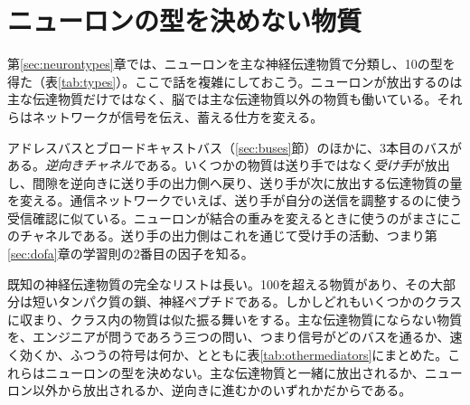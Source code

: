 \chapter{ニューロンの型を決めない物質}
\label{sec:othermediators}

第\ref{sec:neurontypes}章では、ニューロンを主な神経伝達物質で分類し、10の型を得た（表\ref{tab:types}）。ここで話を複雑にしておこう。ニューロンが放出するのは主な伝達物質だけではなく、脳では主な伝達物質以外の物質も働いている。それらはネットワークが信号を伝え、蓄える仕方を変える。

アドレスバスとブロードキャストバス（\ref{sec:buses}節）のほかに、3本目のバスがある。\emph{逆向きチャネル}である。いくつかの物質は送り手ではなく\emph{受け手}が放出し、間隙を逆向きに送り手の出力側へ戻り、送り手が次に放出する伝達物質の量を変える。通信ネットワークでいえば、送り手が自分の送信を調整するのに使う受信確認に似ている。ニューロンが結合の重みを変えるときに使うのがまさにこのチャネルである。送り手の出力側はこれを通じて受け手の活動、つまり第\ref{sec:dofa}章の学習則の2番目の因子を知る。

既知の神経伝達物質の完全なリストは長い。100を超える物質があり、その大部分は短いタンパク質の鎖、神経ペプチドである。しかしどれもいくつかのクラスに収まり、クラス内の物質は似た振る舞いをする。主な伝達物質にならない物質を、エンジニアが問うであろう三つの問い、つまり信号がどのバスを通るか、速く効くか、ふつうの符号は何か、とともに表\ref{tab:othermediators}にまとめた。これらはニューロンの型を決めない。主な伝達物質と一緒に放出されるか、ニューロン以外から放出されるか、逆向きに進むかのいずれかだからである。

